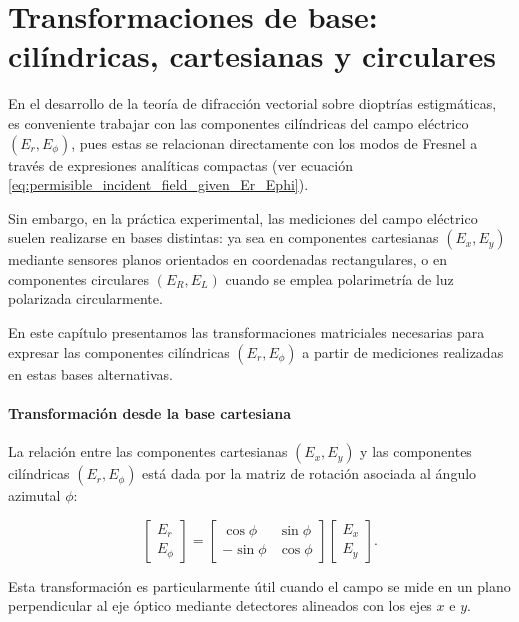 
\chapter{Transformaciones de base: cilíndricas, cartesianas y circulares}
\label{subsec:matricial_ErEphi}

En el desarrollo de la teoría de difracción vectorial sobre dioptrías estigmáticas, es conveniente trabajar con las componentes cilíndricas del campo eléctrico $(E_r, E_\phi)$, pues estas se relacionan directamente con los modos de Fresnel a través de expresiones analíticas compactas (ver ecuación \eqref{eq:permisible_incident_field_given_Er_Ephi}).

Sin embargo, en la práctica experimental, las mediciones del campo eléctrico suelen realizarse en bases distintas: ya sea en componentes cartesianas $(E_x, E_y)$ mediante sensores planos orientados en coordenadas rectangulares, o en componentes circulares $(E_R, E_L)$ cuando se emplea polarimetría de luz polarizada circularmente.

En este capítulo presentamos las transformaciones matriciales necesarias para expresar las componentes cilíndricas $(E_r, E_\phi)$ a partir de mediciones realizadas en estas bases alternativas.

\subsubsection{Transformación desde la base cartesiana}

La relación entre las componentes cartesianas $(E_x, E_y)$ y las componentes cilíndricas $(E_r, E_\phi)$ está dada por la matriz de rotación asociada al ángulo azimutal $\phi$:

\begin{equation}
\begin{bmatrix}
E_r \\[4pt]
E_\phi
\end{bmatrix}
=
\begin{bmatrix}
\cos\phi & \sin\phi \\[4pt]
-\sin\phi & \cos\phi
\end{bmatrix}
\begin{bmatrix}
E_x \\[4pt]
E_y
\end{bmatrix}.
\label{eq:Er_Ephi_from_cartesian}
\end{equation}

Esta transformación es particularmente útil cuando el campo se mide en un plano perpendicular al eje óptico mediante detectores alineados con los ejes $x$ e $y$.


